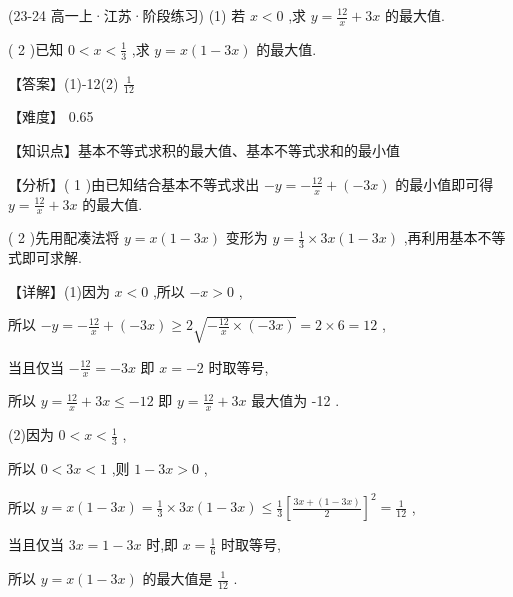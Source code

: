 \documentclass[11pt,a4paper]{article}
\begin{document}
\begin{hmwk} 
 (23-24 高一上·江苏·阶段练习) (1) 若 \(\displaystyle x < 0\) ,求 \(\displaystyle y = \frac{12}{x} + {3x}\) 的最大值.

( 2 )已知 \(\displaystyle 0 < x < \frac{1}{3}\) ,求 \(\displaystyle y = x\left( {1 - {3x}}\right)\) 的最大值.

\begin{jiexi}[55]
【答案】(1)-12(2) \(\displaystyle \frac{1}{12}\)

【难度】 0.65

【知识点】基本不等式求积的最大值、基本不等式求和的最小值

【分析】( 1 )由已知结合基本不等式求出 \(\displaystyle - y =  - \frac{12}{x} + \left( {-{3x}}\right)\) 的最小值即可得 \(\displaystyle y = \frac{12}{x} + {3x}\) 的最大值.

( 2 )先用配凑法将 \(\displaystyle y = x\left( {1 - {3x}}\right)\) 变形为 \(\displaystyle y = \frac{1}{3} \times  {3x}\left( {1 - {3x}}\right)\) ,再利用基本不等式即可求解.

【详解】(1)因为 \(\displaystyle x < 0\) ,所以 \(\displaystyle - x > 0\) ,

所以 \(\displaystyle - y =  - \frac{12}{x} + \left( {-{3x}}\right)  \geq  2\sqrt{-\frac{12}{x} \times  \left( {-{3x}}\right) } = 2 \times  6 = {12}\) ,

当且仅当 \(\displaystyle - \frac{12}{x} =  - {3x}\) 即 \(\displaystyle x =  - 2\) 时取等号,

所以 \(\displaystyle y = \frac{12}{x} + {3x} \leq   - {12}\) 即 \(\displaystyle y = \frac{12}{x} + {3x}\) 最大值为 -12 .

(2)因为 \(\displaystyle 0 < x < \frac{1}{3}\) ,

所以 \(\displaystyle 0 < {3x} < 1\) ,则 \(\displaystyle 1 - {3x} > 0\) ,

所以 \(\displaystyle y = x\left( {1 - {3x}}\right)  = \frac{1}{3} \times  {3x}\left( {1 - {3x}}\right)  \leq  \frac{1}{3}{\left\lbrack  \frac{{3x} + \left( {1 - {3x}}\right) }{2}\right\rbrack  }^{2} = \frac{1}{12}\) ,

当且仅当 \(\displaystyle {3x} = 1 - {3x}\) 时,即 \(\displaystyle x = \frac{1}{6}\) 时取等号,

所以 \(\displaystyle y = x\left( {1 - {3x}}\right)\) 的最大值是 \(\displaystyle \frac{1}{12}\) .

\end{jiexi}
\end{hmwk}
\end{document}
